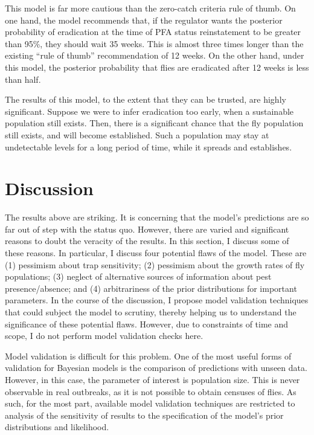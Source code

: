 \documentclass[
  oneside]{book}
\begin{document}
This model is far more cautious than the zero-catch criteria rule of thumb. On one hand, the model recommends that, if the regulator wants the posterior probability of eradication at the time of PFA status reinstatement to be greater than 95\%, they should wait 35 weeks. This is almost three times longer than the existing ``rule of thumb'' recommendation of 12 weeks. On the other hand, under this model, the posterior probability that flies are eradicated after 12 weeks is less than half.

The results of this model, to the extent that they can be trusted, are highly significant. Suppose we were to infer eradication too early, when a sustainable population still exists. Then, there is a significant chance that the fly population still exists, and will become established. Such a population may stay at undetectable levels for a long period of time, while it spreads and establishes.

\hypertarget{discussion}{%
\section{Discussion}\label{discussion}}

The results above are striking. It is concerning that the model's predictions are so far out of step with the status quo. However, there are varied and significant reasons to doubt the veracity of the results. In this section, I discuss some of these reasons. In particular, I discuss four potential flaws of the model. These are (1) pessimism about trap sensitivity; (2) pessimism about the growth rates of fly populations; (3) neglect of alternative sources of information about pest presence/absence; and (4) arbitrariness of the prior distributions for important parameters. In the course of the discussion, I propose model validation techniques that could subject the model to scrutiny, thereby helping us to understand the significance of these potential flaws. However, due to constraints of time and scope, I do not perform model validation checks here.

Model validation is difficult for this problem. One of the most useful forms of validation for Bayesian models is the comparison of predictions with unseen data. However, in this case, the parameter of interest is population size. This is never observable in real outbreaks, as it is not possible to obtain censuses of flies. As such, for the most part, available model validation techniques are restricted to analysis of the sensitivity of results to the specification of the model's prior distributions and likelihood.
\end{document}
